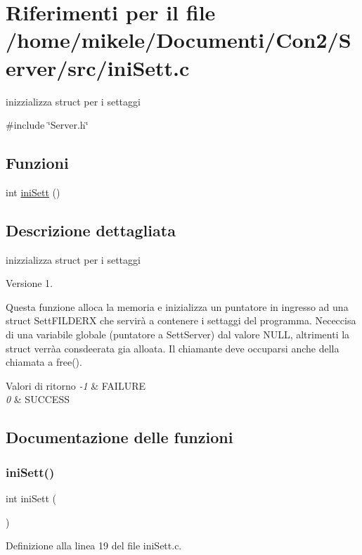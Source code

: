 \hypertarget{a00017}{}\section{Riferimenti per il file /home/mikele/\+Documenti/\+Con2/\+Server/src/ini\+Sett.c}
\label{a00017}


inizzializza struct per i settaggi  


{\ttfamily \#include \char`\"{}Server.\+h\char`\"{}}\newline
\subsection*{Funzioni}
\begin{DoxyCompactItemize}
\item 
int \mbox{\hyperlink{a00017_a280a493f2edcc08fb9c250acac6163ff}{ini\+Sett}} ()
\end{DoxyCompactItemize}


\subsection{Descrizione dettagliata}
inizzializza struct per i settaggi 





\begin{DoxyVersion}{Versione}
1.
\end{DoxyVersion}
Questa funzione alloca la memoria e inizializza un puntatore in ingresso ad una struct Sett\+F\+I\+L\+D\+E\+RX che servirà a contenere i settaggi del programma. Nececcisa di una variabile globale (puntatore a Sett\+Server) dal valore N\+U\+LL, altrimenti la struct verràa\textquotesingle{} consdeerata gia\textquotesingle{} alloata. Il chiamante deve occuparsi anche della chiamata a free().


\begin{DoxyRetVals}{Valori di ritorno}
{\em -\/1} & F\+A\+I\+L\+U\+RE \\
\hline
{\em 0} & S\+U\+C\+C\+E\+SS \\
\hline
\end{DoxyRetVals}


\subsection{Documentazione delle funzioni}
\mbox{\label{a00017_a280a493f2edcc08fb9c250acac6163ff}} 
\subsubsection{\texorpdfstring{iniSett()}{iniSett()}}
{\footnotesize\ttfamily int ini\+Sett (\begin{DoxyParamCaption}{ }\end{DoxyParamCaption})}



Definizione alla linea 19 del file ini\+Sett.\+c.

